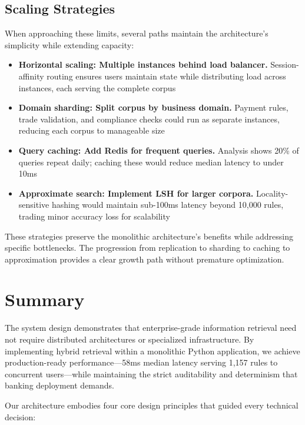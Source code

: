 \subsection{Scaling Strategies}

When approaching these limits, several paths maintain the architecture's simplicity while extending capacity:

\begin{itemize}[leftmargin=*,itemsep=3pt,topsep=3pt]
  \item \textbf{Horizontal scaling: Multiple instances behind load balancer.} Session-affinity routing ensures users maintain state while distributing load across instances, each serving the complete corpus
  \item \textbf{Domain sharding: Split corpus by business domain.} Payment rules, trade validation, and compliance checks could run as separate instances, reducing each corpus to manageable size
  \item \textbf{Query caching: Add Redis for frequent queries.} Analysis shows 20\% of queries repeat daily; caching these would reduce median latency to under 10ms
  \item \textbf{Approximate search: Implement LSH for larger corpora.} Locality-sensitive hashing would maintain sub-100ms latency beyond 10,000 rules, trading minor accuracy loss for scalability
\end{itemize}

These strategies preserve the monolithic architecture's benefits while addressing specific bottlenecks. The progression from replication to sharding to caching to approximation provides a clear growth path without premature optimization.

\newpage
\section{Summary}

The system design demonstrates that enterprise-grade information retrieval need not require distributed architectures or specialized infrastructure. By implementing hybrid retrieval within a monolithic Python application, we achieve production-ready performance—58ms median latency serving 1,157 rules to concurrent users—while maintaining the strict auditability and determinism that banking deployment demands.

Our architecture embodies four core design principles that guided every technical decision:

